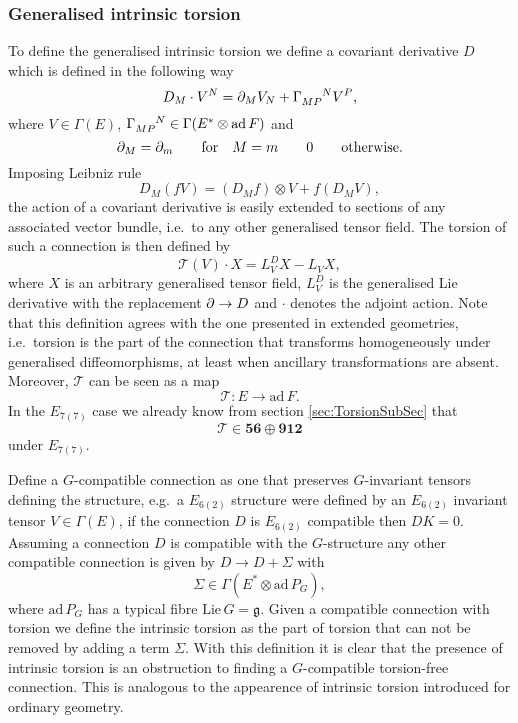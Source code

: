 \subsubsection{Generalised intrinsic torsion}
To define the generalised intrinsic torsion we define a covariant derivative $D$ which is defined in the following way 
\begin{equation}
    D_M\cdot V^N = \pd_MV_N+\tensor{\Gamma}{_M_P^N}V^P,
\end{equation}
where $V\in\Gamma(E)$, $\tensor{\Gamma}{_{MP}^N}\in\Gamma(E^*\otimes \text{ad}\,F)$ and 
\begin{equation}
    \partial_M = \partial_m \qquad \text{for} \quad M=m\qquad 0\qquad \text{otherwise}.
\end{equation}
Imposing Leibniz rule 
\begin{equation}
    D_M(fV) = (D_Mf)\otimes V+f(D_MV),
\end{equation}
the action of a covariant derivative is easily extended to sections of any associated vector bundle, i.e.\ to any other generalised tensor field. The torsion of such a connection is then defined by 
\begin{equation}
    \mathscr{T}(V)\cdot X = L_V^D X-L_V X,
\end{equation}
where $X$ is an arbitrary generalised tensor field, $L_V^D$ is the generalised Lie derivative with the replacement $\partial\to D$ and $\cdot$ denotes the adjoint action. Note that this definition agrees with the one presented in extended geometries, i.e.\ torsion is the part of the connection that transforms homogeneously under generalised diffeomorphisms, at least when ancillary transformations are absent. Moreover, $\mathscr{T}$ can be seen as a map
\begin{equation}
    \mathscr{T}: E\to \text{ad}\, F. 
\end{equation}
In the $E_{7(7)}$ case we already know from section \ref{sec:TorsionSubSec} that
\begin{equation}
    \mathscr{T}\in \mathbf{56}\oplus\mathbf{912}
\end{equation}
under $E_{7(7)}$. 

Define a $G$-compatible connection as one that preserves $G$-invariant tensors defining the structure, e.g.\ a $E_{6(2)}$ structure were defined by an $E_{6(2)}$ invariant tensor $V\in\Gamma(E)$, if the connection $D$ is $E_{6(2)}$ compatible then $DK=0$. Assuming a connection $D$ is compatible with the $G$-structure any other compatible connection is given by $D\to D+\Sigma$ with 
\begin{equation}
    \Sigma \in \Gamma(E^*\otimes \text{ad}\,P_G),
\end{equation}
where $\text{ad}\,P_G$ has a typical fibre $\text{Lie}\,G=\mathfrak{g}$. Given a compatible connection with torsion we define the intrinsic torsion as the part of torsion that can not be removed by adding a term $\Sigma$. With this definition it is clear that the presence of intrinsic torsion is an obstruction to finding a $G$-compatible torsion-free connection. This is analogous to the appearence of intrinsic torsion introduced for ordinary geometry. 

